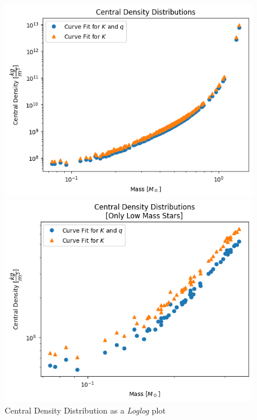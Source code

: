 \documentclass[letterpaper,12pt]{article}
\begin{document}
\begin{figure}[H]
\begin{minipage}{.5\textwidth}
\centerline{\includegraphics[width=\linewidth]{figures/1_n_ll_rho_m.png}}
\end{minipage}
\begin{minipage}{.5\textwidth}
\centerline{\includegraphics[width=\linewidth]{figures/2_n_ll_rho_m_.png}}
\end{minipage}
\caption{Central Density Distribution as a \textit{Loglog} plot}
\label{fig:12}
\end{figure}
\end{document}
